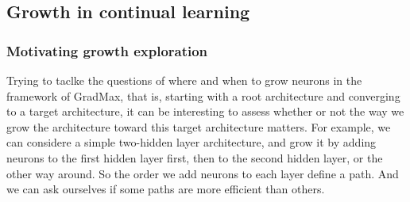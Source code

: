 \documentclass{article}
\begin{document}
\subsection{Growth in continual learning}
\subsubsection{Motivating growth exploration}


Trying to taclke the questions of where and when to grow neurons in the framework of GradMax, that is, starting with a root architecture and converging to a target architecture, it can be interesting to assess whether or not the way we grow the architecture toward this target architecture matters. For example, we can considere a simple two-hidden layer architecture, and grow it by adding neurons to the first hidden layer first, then to the second hidden layer, or the other way around. So the order we add neurons to each layer define a path. And we can ask ourselves if some paths are more efficient than others.
\end{document}
